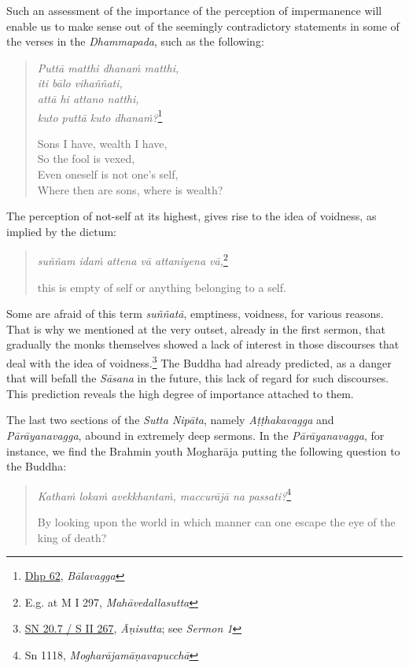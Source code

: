Such an assessment of the importance of the perception of impermanence will enable us to make sense out of the seemingly contradictory statements in some of the verses in the \emph{Dhammapada}, such as the following:

\clearpage

\begin{quote}
\emph{Puttā matthi dhanaṁ matthi,}\\
\emph{iti bālo vihaññati,}\\
\emph{attā hi attano natthi,}\\
\emph{kuto puttā kuto dhanaṁ?}\footnote{\href{https://suttacentral.net/dhp60-75/pli/ms}{Dhp 62}, \emph{Bālavagga}}

Sons I have, wealth I have,\\
So the fool is vexed,\\
Even oneself is not one's self,\\
Where then are sons, where is wealth?
\end{quote}

The perception of not-self at its highest, gives rise to the idea of voidness, as implied by the dictum:

\begin{quote}
\emph{suññam idaṁ attena vā attaniyena vā,}\footnote{E.g. at M I 297, \emph{Mahāvedallasutta}}

this is empty of self or anything belonging to a self.
\end{quote}

Some are afraid of this term \emph{suññatā}, emptiness, voidness, for various reasons. That is why we mentioned at the very outset, already in the first sermon, that gradually the monks themselves showed a lack of interest in those discourses that deal with the idea of voidness.\footnote{\href{https://suttacentral.net/sn20.7/pli/ms}{SN 20.7 / S II 267}, \emph{Āṇisutta}; see \emph{Sermon 1}} The Buddha had already predicted, as a danger that will befall the \emph{Sāsana} in the future, this lack of regard for such discourses. This prediction reveals the high degree of importance attached to them.

The last two sections of the \emph{Sutta Nipāta}, namely \emph{Aṭṭhakavagga} and \emph{Pārāyanavagga}, abound in extremely deep sermons. In the \emph{Pārāyanavagga}, for instance, we find the Brahmin youth Mogharāja putting the following question to the Buddha:

\begin{quote}
\emph{Kathaṁ lokaṁ avekkhantaṁ, maccurājā na passati?}\footnote{Sn 1118, \emph{Mogharājamāṇavapucchā}}

By looking upon the world in which manner can one escape the eye of the king of death?
\end{quote}

